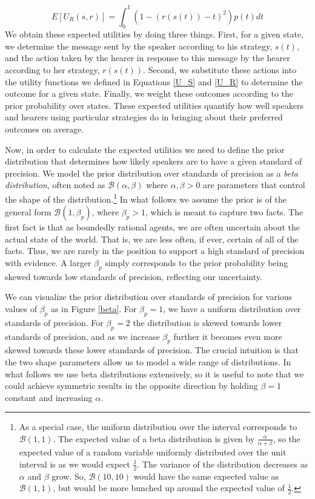 \documentclass[linguex]{sp}
\theoremstyle{definition} \newtheorem{definition}{Definition}
\begin{document}
\begin{equation}
      E[U_R(s, r)] = \int_0^1 \left( 1 -(r(s(t)) - t)^2 \right) p(t) dt
\end{equation}
We obtain these expected utilities by doing three things. First, for a given state, we determine the message sent by the speaker according to his strategy, $s(t)$, and the action taken by the hearer in response to this message by the hearer according to her strategy, $r(s(t))$.  Second, we substitute these actions into the utility functions we defined in Equations \eqref{U_S} and \eqref{U_R} to determine the outcome for a given state. Finally, we weight these outcomes according to the prior probability over states. These expected utilities quantify how well speakers and hearers using particular strategies do in bringing about their preferred outcomes on average. 

Now, in order to calculate the expected utilities we need to define the prior distribution that determines how likely speakers are to have a given standard of precision. We model the prior distribution over standards of precision as a \emph{beta distribution}, often noted as $\mathcal{B}(\alpha, \beta)$ where $\alpha, \beta > 0$ are parameters that control the shape of the distribution.\footnote{As a special case, the uniform distribution over the interval corresponds to $\mathcal{B}(1,1)$. The expected value of a beta distribution is given by $\frac{\alpha}{\alpha + \beta}$, so the expected value of a random variable uniformly distributed over the unit interval is as we would expect $\frac{1}{2}$. The variance of the distribution decreases as $\alpha$ and $\beta$ grow. So, $\mathcal{B}(10,10)$ would have the same expected value as $\mathcal{B}(1,1)$, but would be more bunched up around the expected value of $\frac{1}{2}$.} In what follows we assume the prior is of the general form $\mathcal{B}(1,\beta_p)$, where $\beta_p > 1$, which is meant to capture two facts. The first fact is that as boundedly rational agents, we are often uncertain about the actual state of the world. That is, we are less often, if ever, certain of all of the facts. Thus, we are rarely in the position to support a high standard of precision with evidence. A larger $\beta_p$ simply corresponds to the prior probability being skewed towards low standards of precision, reflecting our uncertainty.  

We can visualize the prior distribution over standards of precision for various values of $\beta_p$ as in Figure \ref{beta}. For $\beta_p = 1$, we have a uniform distribution over standards of precision. For $\beta_p = 2$ the distribution is skewed towards lower standards of precision, and as we increase $\beta_p$ further it becomes even more skewed towards these lower standards of precision.   The crucial intuition is that the two shape parameters allow us to model a wide range of distributions. In what follows we use beta distributions extensively, so it is useful to note that we could achieve symmetric results in the opposite direction by holding $\beta = 1$ constant and increasing $\alpha$. 
\end{document}
